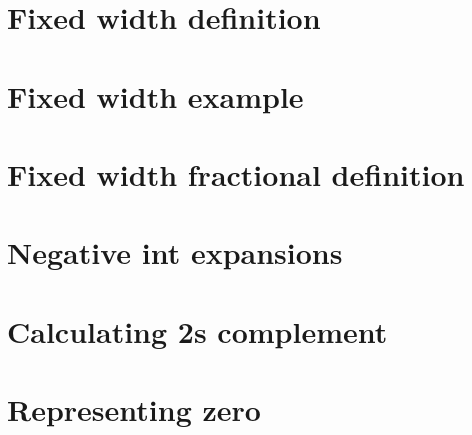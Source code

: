 \section*{Fixed width definition}

\vfill
\section*{Fixed width example}

\vfill
\section*{Fixed width fractional definition}

\vfill
\section*{Negative int expansions}

\vfill
\section*{Calculating 2s complement}

\vfill
\section*{Representing zero}

\vfill
